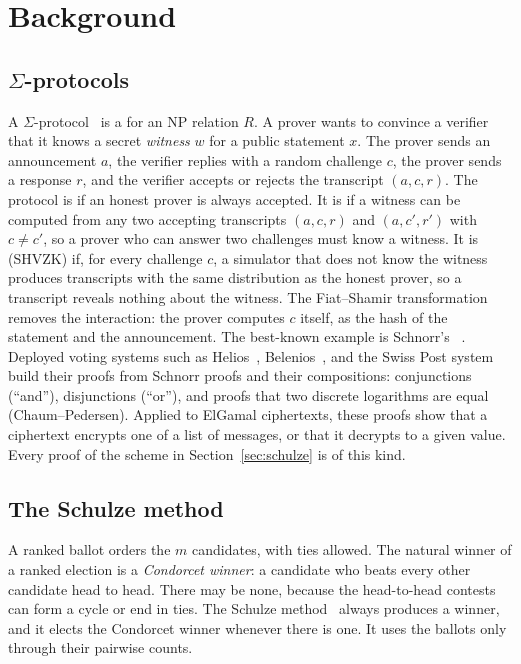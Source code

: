 \section{Background}\label{sec:background}

\subsection{$\Sigma$-protocols}\label{sigma_protocol}
A $\Sigma$-protocol~\cite{cramer1996modular,cramer1994proofs} is a
 for an NP relation $R$. A prover
wants to convince a verifier that it knows a secret \emph{witness} $w$
for a public statement $x$. The prover sends an announcement $a$, the
verifier replies with a random challenge $c$, the prover sends a response
$r$, and the verifier accepts or rejects the transcript $(a,c,r)$. The
protocol is  if an honest prover is always accepted.
It is  if a witness can be computed from any two
accepting transcripts $(a,c,r)$ and $(a,c',r')$ with $c \ne c'$, so a
prover who can answer two challenges must know a witness. It is
 (SHVZK) if, for every
challenge $c$, a simulator that does not know the witness produces
transcripts with the same distribution as the honest prover, so a
transcript reveals nothing about the witness. The Fiat--Shamir
transformation removes the interaction: the prover computes $c$ itself,
as the hash of the statement and the announcement. The best-known example is
Schnorr's ~\cite{schnorr1991efficient}.
Deployed voting systems such as Helios~\cite{adida2008helios},
Belenios~\cite{belenios2019}, and the Swiss Post
system~\cite{10.1007/978-3-031-15911-4_4} build their proofs from Schnorr
proofs and their compositions: conjunctions (``and''), disjunctions
(``or''), and proofs that two discrete logarithms are equal
(Chaum--Pedersen). Applied to ElGamal ciphertexts, these proofs show that
a ciphertext encrypts one of a list of messages, or that it decrypts to
a given value. Every proof of the scheme in Section~\ref{sec:schulze} is
of this kind.

\subsection{The Schulze method}\label{sec:bg:schulze}
A ranked ballot orders the $m$ candidates, with ties allowed. The
natural winner of a ranked election is a \emph{Condorcet winner}: a
candidate who beats every other candidate head to head. There may be
none, because the head-to-head contests can form a cycle or end in ties.
The Schulze method~\cite{schulze2011} always produces a winner, and it
elects the Condorcet winner whenever there is one. It uses the ballots
only through their pairwise counts.

